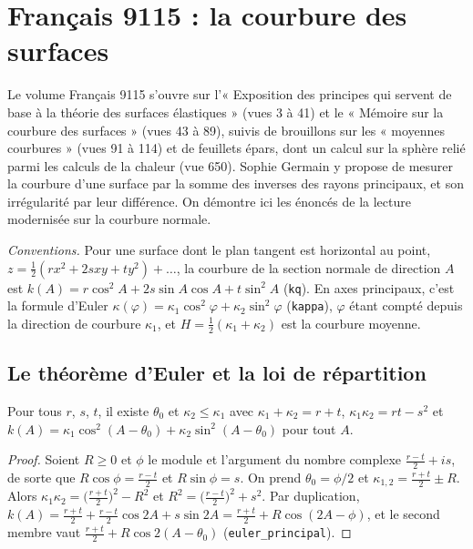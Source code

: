 \section[Français 9115 : la courbure des surfaces]{Français 9115 : la courbure des surfaces\protect{}}\label{sec:fr-9115-courbure}

Le volume Français 9115 s'ouvre sur l'« Exposition des principes qui servent de base à la théorie des surfaces élastiques » (vues 3 à 41) et le « Mémoire sur la courbure des surfaces » (vues 43 à 89), suivis de brouillons sur les « moyennes courbures » (vues 91 à 114) et de feuillets épars, dont un calcul sur la sphère relié parmi les calculs de la chaleur (vue 650). Sophie Germain y propose de mesurer la courbure d'une surface par la somme des inverses des rayons principaux, et son irrégularité par leur différence. On démontre ici les énoncés de la lecture modernisée sur la courbure normale.

\noindent\emph{Conventions.} Pour une surface dont le plan tangent est horizontal au point, $z = \frac12(rx^2 + 2sxy + ty^2) + \dots$, la courbure de la section normale de direction $A$ est $k(A) = r\cos^2A + 2s\sin A\cos A + t\sin^2A$ (\texttt{kq}). En axes principaux, c'est la formule d'Euler $\kappa(\varphi) = \kappa_1\cos^2\varphi + \kappa_2\sin^2\varphi$ (\texttt{kappa}), $\varphi$ étant compté depuis la direction de courbure $\kappa_1$, et $H = \frac12(\kappa_1 + \kappa_2)$ est la courbure moyenne.

\subsection*{Le théorème d'Euler et la loi de répartition}

\begin{enonce}
Pour tous $r$, $s$, $t$, il existe $\theta_0$ et $\kappa_2 \leq \kappa_1$ avec $\kappa_1 + \kappa_2 = r + t$, $\kappa_1\kappa_2 = rt - s^2$ et $k(A) = \kappa_1\cos^2(A - \theta_0) + \kappa_2\sin^2(A - \theta_0)$ pour tout $A$.
\end{enonce}

\begin{proof}
Soient $R \geq 0$ et $\phi$ le module et l'argument du nombre complexe $\frac{r-t}2 + is$, de sorte que $R\cos\phi = \frac{r-t}2$ et $R\sin\phi = s$. On prend $\theta_0 = \phi/2$ et $\kappa_{1,2} = \frac{r+t}2 \pm R$. Alors $\kappa_1\kappa_2 = \bigl(\frac{r+t}2\bigr)^2 - R^2$ et $R^2 = \bigl(\frac{r-t}2\bigr)^2 + s^2$. Par duplication, $k(A) = \frac{r+t}2 + \frac{r-t}2\cos 2A + s\sin 2A = \frac{r+t}2 + R\cos(2A - \phi)$, et le second membre vaut $\frac{r+t}2 + R\cos 2(A - \theta_0)$ (\texttt{euler\_principal}).
\end{proof}

